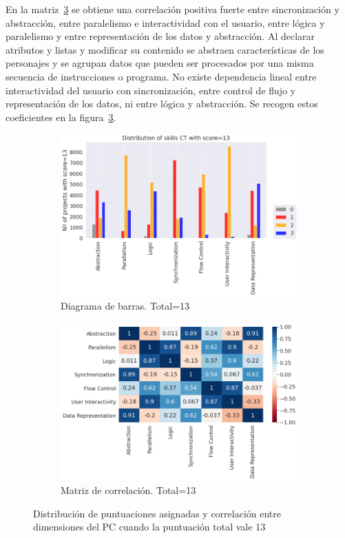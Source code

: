 \documentclass[a4paper, 12pt]{book}
\begin{document}
En la matriz~\ref{fig:corr13} se obtiene una correlación positiva fuerte entre sincronización y abstracción, entre paralelismo e interactividad con el usuario, entre lógica y paralelismo 
y entre representación de los datos y abstracción. Al declarar atributos y listas y modificar su contenido se abstraen características de los personajes y se agrupan datos que pueden ser procesados por una misma secuencia de instrucciones o programa. No existe dependencia lineal entre interactividad del usuario con sincronización, entre control de flujo y representación de los datos, ni entre lógica y abstracción. Se recogen estos coeficientes en la figura~\ref{fig:corr13}. 

\begin{figure}[H]
    \centering
    \begin{subfigure}[h]{.49\textwidth} 
        \includegraphics[width=\textwidth]{img/distribucion_13_Scratch}
        \caption{Diagrama de barras. Total=13}
        \label{fig:total13}
    \end{subfigure}       
    \begin{subfigure}[h]{.49\textwidth} 
        \includegraphics[width=\textwidth]{img/corr_13_Scratch}
        \caption{Matriz de correlación. Total=13}
        \label{fig:corr13}
    \end{subfigure}
     \caption{Distribución de puntuaciones asignadas y correlación entre dimensiones del PC cuando la puntuación total vale 13}
\end{figure}
\end{document}
